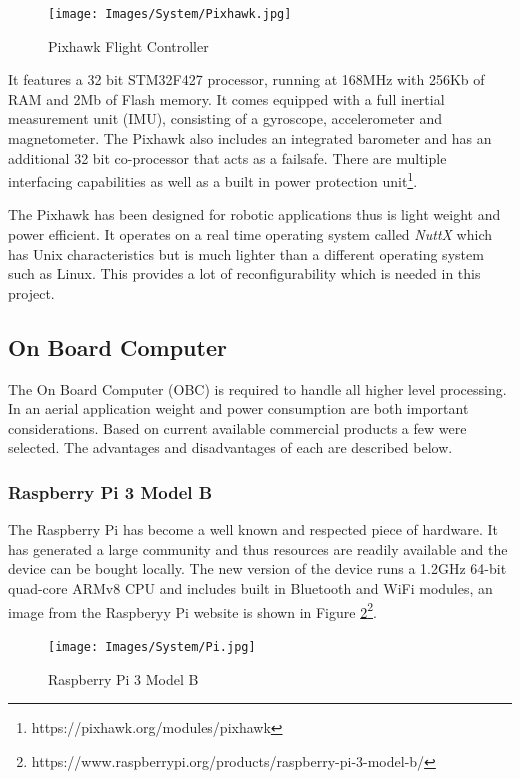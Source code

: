 			\begin{figure}[H]
				\centering
				\texttt{[image: Images/System/Pixhawk.jpg]}     
				\caption{Pixhawk Flight Controller}
				\label{IM_Pixhawk}
			\end{figure}
			
			It features a 32 bit STM32F427 processor, running at 168MHz with 256Kb of RAM and 2Mb of Flash memory. It comes equipped with a full inertial measurement unit (IMU), consisting of a gyroscope, accelerometer and magnetometer. The Pixhawk also includes an integrated barometer and has an additional 32 bit co-processor that acts as a failsafe. There are multiple interfacing capabilities as well as a built in power protection unit\footnote{https://pixhawk.org/modules/pixhawk}. 
			
			The Pixhawk has been designed for robotic applications thus is light weight and power efficient. It operates on a real time operating system called \textit{NuttX} which has Unix characteristics but is much lighter than a different operating system such as Linux. This provides a lot of reconfigurability which is needed in this project.
		
	
		\subsection{On Board Computer}
		The On Board Computer (OBC) is required to handle all higher level processing. In an aerial application weight and power consumption are both important considerations. Based on current available commercial products a few were selected. The advantages and disadvantages of each are described below.
	
			\subsubsection{Raspberry Pi 3 Model B}
			
			The Raspberry Pi has become a well known and respected piece of hardware. It has generated a large community and thus resources are readily available and the device can be bought locally. The new version of the device runs a 1.2GHz 64-bit quad-core ARMv8 CPU and includes built in Bluetooth and WiFi modules, an image from the Raspberyy Pi website is shown in Figure \ref{IM_Pi}\footnote{https://www.raspberrypi.org/products/raspberry-pi-3-model-b/}. 
			
			\begin{figure}[H]
				\centering
				\texttt{[image: Images/System/Pi.jpg]}     
				\caption{Raspberry Pi 3 Model B}
				\label{IM_Pi}
			\end{figure}
			
